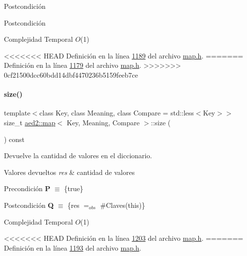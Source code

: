 \begin{DoxyPostcond}{\-Postcondición}
\begin{DoxyPostcond}{\-Postcondición}
\begin{DoxyDescription}
\item[Complejidad Temporal]$O$(1)
\end{DoxyDescription}

<<<<<<< HEAD
\-Definición en la línea \hyperlink{map_8h_source_l01189}{1189} del archivo \hyperlink{map_8h_source}{map.\-h}.
=======
Definición en la línea \hyperlink{map_8h_source_l01179}{1179} del archivo \hyperlink{map_8h_source}{map.\+h}.
>>>>>>> 0cf21500dcc60bdd14dbf4470236b5159feeb7ce

\mbox{\label{classaed2_1_1map_aa6e806b3be6dc0da79adbfae08b571bf_aa6e806b3be6dc0da79adbfae08b571bf}} 
\paragraph{\texorpdfstring{size()}{size()}}
{\footnotesize\ttfamily template$<$class Key, class Meaning, class Compare = std\+::less$<$\+Key$>$$>$ \\
size\+\_\+t \hyperlink{classaed2_1_1map}{aed2\+::map}$<$ Key, Meaning, Compare $>$\+::size (\begin{DoxyParamCaption}{ }\end{DoxyParamCaption}) const\hspace{0.3cm}{\ttfamily [inline]}}



Devuelve la cantidad de valores en el diccionario. 


\begin{DoxyRetVals}{Valores devueltos}
{\em res} & cantidad de valores\\
\hline
\end{DoxyRetVals}
\begin{DoxyPrecond}{Precondición}
{\bfseries P} $\equiv$ \{true\} 
\end{DoxyPrecond}
\begin{DoxyPostcond}{Postcondición}
{\bfseries Q} $\equiv$ \{res $=_{obs}$ \#Claves(this)\}
\end{DoxyPostcond}

\begin{DoxyDescription}
\item[Complejidad Temporal]$O$(1)
\end{DoxyDescription}

<<<<<<< HEAD
\-Definición en la línea \hyperlink{map_8h_source_l01203}{1203} del archivo \hyperlink{map_8h_source}{map.\-h}.
=======
Definición en la línea \hyperlink{map_8h_source_l01193}{1193} del archivo \hyperlink{map_8h_source}{map.\+h}.


\end{DoxyPostcond}
\end{DoxyPostcond}

